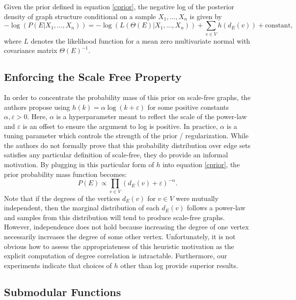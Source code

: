 \documentclass{uwstat572}
\theoremstyle{remark}
\theoremstyle{definition}
\begin{document}
Given the prior defined in equation \eqref{cprior}, the negative log of the posterior density of graph structure conditional on a sample $X_1,...,X_n$ is given by
\begin{equation}\label{logpost}
    -\log( P( E | X_1,...,X_n)) = - \log(L(\Theta(E) | X_1,...,X_n) ) + \sum_{v \in V} h( d_E(v)) + \text{constant},
\end{equation}
where $L$ denotes the likelihood function for a mean zero multivariate normal with covariance matrix $\Theta(E)^{-1}$. 

\subsection{Enforcing the Scale Free Property}

In order to concentrate the probability mass of this prior on scale-free graphs, the authors propose using $h(k) = \alpha \log(k + \varepsilon)$ for some positive constants $\alpha, \varepsilon > 0$.  Here, $\alpha$ is a  hyperparameter meant to reflect the scale of the power-law and $\varepsilon$ is an offset to ensure the argument to log is positive. In practice, $\alpha$ is a tuning parameter which controls the strength of the prior / regularization. While the authors do not formally prove that this probability distribution over edge sets satisfies any particular definition of scale-free, they do provide an informal motivation.  By plugging in this particular form of $h$ into equation \eqref{cprior}, the prior probability mass function becomes:
\begin{equation*}
    P( E) \propto \prod_{v \in V} (d_E(v) + \varepsilon)^{-\alpha}.
\end{equation*}
Note that if the degrees of the vertices $d_E(v)$ for $v \in V$ were mutually independent, then the marginal distribution of each $d_E(v)$ follows a power-law and samples from this distribution will tend to produce scale-free graphs.  However, independence does not hold because increasing the degree of one vertex necessarily increases the degree of some other vertex.  Unfortunately, it is not obvious how to assess the appropriateness of this heuristic motivation as the explicit computation of degree correlation is intractable.  Furthermore, our experiments indicate that choices of $h$ other than log provide superior results.

\subsection{Submodular Functions}
\end{document}
